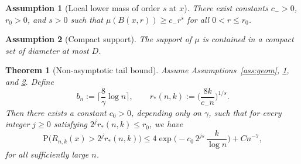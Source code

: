 \documentclass[10pt,a4paper]{amsart}
\newtheorem{assumption}{Assumption}
\newtheorem{theorem}{Theorem}
\def\P{{\mathrm P}}
\begin{document}
\begin{assumption}[Local lower mass of order $s$ at $x$]\label{ass:lower}
There exist constants $c_->0$, $r_0>0$, and $s>0$ such that $\mu(B(x,r)) \ge c_- r^s$ for all $0<r\le r_0$.
\end{assumption}

\begin{assumption}[Compact support]\label{ass:compact}
The support of $\mu$ is contained in a compact set of diameter at most $D$.
\end{assumption}

\begin{theorem}[Non-asymptotic tail bound]\label{thm:tail}
Assume Assumptions~\ref{ass:geom}, \ref{ass:lower}, and \ref{ass:compact}. Define
\[
  b_n := \Big\lceil \frac{8}{\gamma}\log n \Big\rceil,
  \qquad
  r_*(n,k) := \Big(\frac{8k}{c_- n}\Big)^{1/s}.
\]
Then there exists a constant $c_0>0$, depending only on $\gamma$, such that for every integer $j \ge 0$ satisfying $2^j r_*(n,k) \le r_0$, we have
\[
  \P\big(R_{n,k}(x) > 2^j r_*(n,k)\big)
  \le
  4\exp \Big(-c_0\,2^{js}\,\frac{k}{\log n}\Big)
  + C n^{-7},
\]
for all sufficiently large $n$.
\end{theorem}
\end{document}
